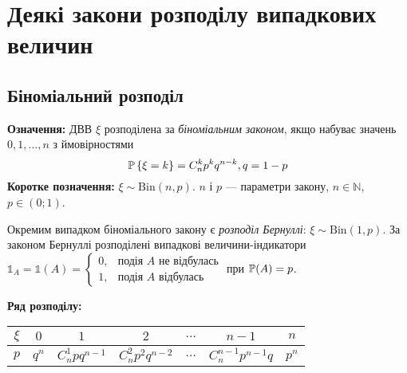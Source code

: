 \section{Деякі закони розподілу випадкових величин}

\subsection{Біноміальний розподіл}
\noindent\textbf{Означення:}
    ДВВ $\xi$ розподілена за \emph{біноміальним законом}, 
    якщо набуває значень $0,1,...,n$ з ймовірностями \begin{equation}
        \P\left\{\xi = k\right\} = C_n^k p^k q^{n-k}, q = 1 - p
    \end{equation}
\textbf{Коротке позначення:} $\xi \sim \mathrm{Bin}(n, p)$.
    $n$ і $p$ --- параметри закону, $n\in \mathbb{N}$, $p\in (0;1)$.

Окремим випадком біноміального закону є \emph{розподіл Бернуллі}: $\xi \sim \mathrm{Bin}(1, p)$.
За законом Бернуллі розподілені випадкові величини-індикатори $\mathds{1}_A = \mathds{1}(A)= \begin{cases}
    0, & \text{подія }A\text{ не відбулась}\\ 1, & \text{подія }A\text{ відбулась}
\end{cases}$ при $\P(A) = p$.

\noindent\textbf{Ряд розподілу:}
\begin{center}
    \begin{tabular}{|c|c|c|c|c|c|c|}
        \hline
        $\xi$ & $0$ & $1$ & $2$ & $...$ & $n-1$ & $n$ \\
        \hline
        $p$ & $q^n$ & $C_n^1 pq^{n-1}$ & $C_n^2 p^2 q^{n-2}$ & $...$ & $C_n^{n-1}p^{n-1}q$ & $p^n$ \\
        \hline
    \end{tabular}
\end{center}

